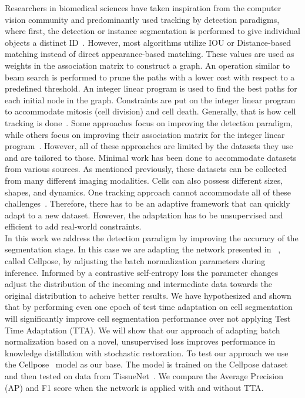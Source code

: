 Researchers in biomedical sciences have taken inspiration from the computer vision community and predominantly used tracking by detection paradigms, where first, the detection or instance segmentation is performed to give individual objects a distinct ID~\cite{bragantini2024ultrack,ershov2022trackmate}. However, most algorithms utilize IOU or Distance-based matching instead of direct appearance-based matching. These values are used as weights in the association matrix to construct a graph. An operation similar to beam search is performed to prune the paths with a lower cost with respect to a predefined threshold.  An integer linear program is used to find the best paths for each initial node in the graph. Constraints are put on the integer linear program to accommodate mitosis (cell division) and cell death. Generally, that is how cell tracking is done~\cite{mavska2023cell}. Some approaches focus on improving the detection paradigm, while others focus on improving their association matrix for the integer linear program~\cite{mavska2023cell}. However, all of these approaches are limited by the datasets they use and are tailored to those. Minimal work has been done to accommodate datasets from various sources. As mentioned previously, these datasets can be collected from many different imaging modalities. Cells can also possess different sizes, shapes, and dynamics. One tracking approach cannot accommodate all of these challenges~\cite{chen2024cmtt}. Therefore, there has to be an adaptive framework that can quickly adapt to a new dataset. However, the adaptation has to be unsupervised and efficient to add real-world constraints.\\

In this work we address the detection paradigm by improving the accuracy of the segmentation stage.  In this case we are adapting the network presented in ~\cite{stringer2021cellpose}, called Cellpose, by adjusting the batch normalization parameters during inference.  Informed by a contrastive self-entropy loss the parameter changes adjust the distribution of the incoming and intermediate data towards the original distribution to acheive better results. We have hypothesized and shown that by performing even one epoch of test time adaptation on cell segmentation will significantly improve cell segmentation performance over not applying Test Time Adaptation (TTA). We will show that our approach of adapting batch normalization based on a novel, unsupervised loss improves performance in knowledge distillation with stochastic restoration. To test our approach we use the Cellpose~\cite{keaton2023celltranspose} model as our base. The model is trained on the Cellpose dataset~\cite{stringer2021cellpose} and then tested on data from TissueNet~\cite{TissueNet,TN2,TN3,TN4}. We compare the Average Precision (AP) and F1 score when the network is applied with and without TTA. 



